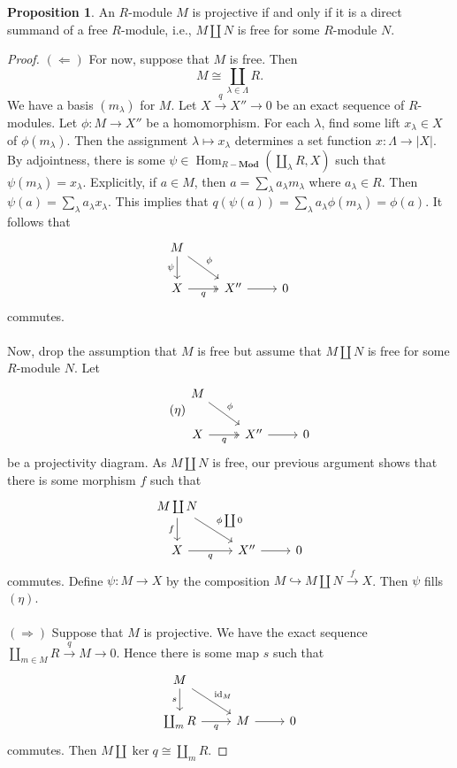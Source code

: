 \documentclass[10pt,letterpaper,cm]{nupset}
\theoremstyle{definition}
\theoremstyle{theorem}
\newtheorem{prop}[definition]{Proposition}
\theoremstyle{remark}
\newcommand{\1}{\mathbf{1}}
\newcommand{\0}{\vec 0}
\DeclareMathOperator{\id}{id}
\DeclareMathOperator{\Hom}{Hom}
\begin{document}
\begin{prop}
An $R$-module $M$ is projective  if and only if it is a direct summand of a free $R$-module, i.e., $M \coprod N$ is free for some $R$-module $N$.
\end{prop}
\begin{proof}
$(\Longleftarrow)$
For now, suppose that $M$ is free. Then $$M \cong \coprod_{\lambda \in \Lambda} R.$$  We have a basis $(m_{\lambda})$ for $M$. Let $X \overset{q}{\longrightarrow}  X'' \to 0$ be an exact sequence of $R$-modules. Let $\phi : M \to X''$ be a homomorphism. For each $\lambda$, find some lift $x_{\lambda}\in X$ of $\phi(m_{\lambda})$. Then the assignment $\lambda \mapsto x_{\lambda}$ determines a set function $x : \Lambda \to |X|$. By adjointness, there is some $\psi \in \Hom_{R{-}\mathbf{Mod}}(\coprod_{\lambda} R, X)$ such that $\psi(m_{\lambda}) = x_{\lambda}$. Explicitly, if $a \in M$, then $a = \sum_{\lambda}a_{\lambda}m_{\lambda}$ where $a_{\lambda}\in R$. Then $\psi(a) = \sum_{\lambda} a_{\lambda}x_{\lambda}$. This implies that $q(\psi(a)) = \sum_{\lambda} a_{\lambda}\phi(m_{\lambda}) = \phi(a)$. It follows that \[
\begin{tikzcd}
M \arrow[rd, "\phi"] \arrow[d, "\psi"'] &  &  \\
X \arrow[r, "q"', two heads] & X'' \arrow[r] & 0
\end{tikzcd}
\] commutes.
\\ \\ Now, drop the assumption that $M$ is free but assume that $M \coprod N$ is free for some $R$-module $N$. Let 
\[ \tag{$\eta$}
\begin{tikzcd}
M \arrow[rd, "\phi"] &  &  \\
X \arrow[r, "q"', two heads] & X'' \arrow[r] & 0
\end{tikzcd}
\] be a projectivity diagram. As $M \coprod N$ is free, our previous argument shows that there is some morphism $f$ such that
\[\begin{tikzcd}
M\coprod N \arrow[rd, "\phi \coprod 0"] \arrow[d, "f"'] &  &  \\
X \arrow[r, "q"'] & X'' \arrow[r] & 0
\end{tikzcd}
\] commutes. Define $\psi : M \to X$ by the composition $M \hookrightarrow M\coprod N \overset{f}{\longrightarrow} X$. Then $\psi$ fills $(\eta)$.
\\ \\ $(\Longrightarrow)$ Suppose that $M$ is projective. We have the exact sequence $\coprod_{m\in M}R \overset{q}{\longrightarrow}  M \to 0$. Hence there is some map $s$ such that 
\[\begin{tikzcd}
M \arrow[rd, "\id_M"] \arrow[d, "s"'] &  &  \\
\coprod_m R \arrow[r, "q"'] & M \arrow[r] & 0
\end{tikzcd}
\] commutes. Then $M \coprod \ker q \cong \coprod_m R$.
\end{proof}
\end{document}
